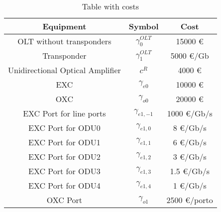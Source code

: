 \begin{table}[H]
\centering
\begin{tabular}{|| c | c | c||}
 \hline
 Equipment & Symbol & Cost \\
 \hline\hline
 OLT without transponders & $\gamma_0^{OLT}$ & 15000 \euro \\
 Transponder & $\gamma_1^{OLT}$ & 5000 \euro/Gb \\
 Unidirectional Optical Amplifier & $c^R$ & 4000 \euro \\
 EXC & $\gamma_{e0}$ & 10000 \euro \\
 OXC & $\gamma_{o0}$ & 20000 \euro \\
 EXC Port for line ports & $\gamma_{e1,-1}$ & 1000 \euro /Gb/s\\
 EXC Port for ODU0 & $\gamma_{e1,0}$ & 8 \euro /Gb/s\\
 EXC Port for ODU1 & $\gamma_{e1,1}$ & 6 \euro /Gb/s\\
 EXC Port for ODU2 & $\gamma_{e1,2}$ & 3 \euro /Gb/s\\
 EXC Port for ODU3 & $\gamma_{e1,3}$ & 1.5 \euro /Gb/s\\
 EXC Port for ODU4 & $\gamma_{e1,4}$ & 1 \euro /Gb/s\\
 OXC Port & $\gamma_{o1}$ & 2500 \euro /porto \\
 \hline
\end{tabular}
\caption{Table with costs}
\label{table_cost_heuristic}
\end{table}
